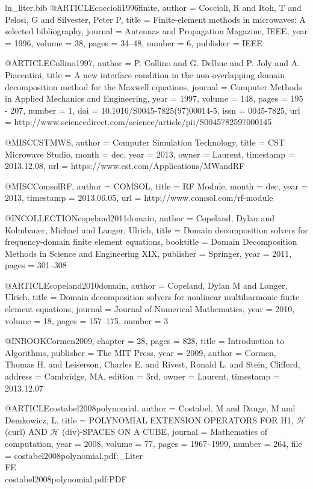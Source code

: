 \begin{filecontents*}{ln_liter.bib}
@ARTICLE{coccioli1996finite,
  author = {Coccioli, R and Itoh, T and Pelosi, G and Silvester, Peter P},
  title = {Finite-element methods in microwaves: A selected bibliography},
  journal = {Antennas and Propagation Magazine, IEEE},
  year = {1996},
  volume = {38},
  pages = {34--48},
  number = {6},
  publisher = {IEEE}
}

@ARTICLE{Collino1997,
  author = {P. Collino and G. Delbue and P. Joly and A. Piacentini},
  title = {A new interface condition in the non-overlapping domain decomposition
	method for the {M}axwell equations},
  journal = {Computer Methods in Applied Mechanics and Engineering},
  year = {1997},
  volume = {148},
  pages = {195 - 207},
  number = {1},
  doi = {10.1016/S0045-7825(97)00014-5},
  issn = {0045-7825},
  url = {http://www.sciencedirect.com/science/article/pii/S0045782597000145}
}

@MISC{CSTMWS,
  author = {{Computer Simulation Technology}},
  title = {{CST Microwave Studio}},
  month = dec,
  year = {2013},
  owner = {Laurent},
  timestamp = {2013.12.08},
  url = {https://www.cst.com/Applications/MWandRF}
}

@MISC{ComsolRF,
  author = {COMSOL},
  title = {{RF Module}},
  month = dec,
  year = {2013},
  timestamp = {2013.06.05},
  url = {http://www.comsol.com/rf-module}
}

@INCOLLECTION{copeland2011domain,
  author = {Copeland, Dylan and Kolmbauer, Michael and Langer, Ulrich},
  title = {Domain decomposition solvers for frequency-domain finite element
	equations},
  booktitle = {Domain Decomposition Methods in Science and Engineering XIX},
  publisher = {Springer},
  year = {2011},
  pages = {301--308}
}

@ARTICLE{copeland2010domain,
  author = {Copeland, Dylan M and Langer, Ulrich},
  title = {Domain decomposition solvers for nonlinear multiharmonic finite element
	equations},
  journal = {Journal of Numerical Mathematics},
  year = {2010},
  volume = {18},
  pages = {157--175},
  number = {3}
}

@INBOOK{Cormen2009,
  chapter = {28},
  pages = {828},
  title = {Introduction to Algorithms},
  publisher = {The MIT Press},
  year = {2009},
  author = {Cormen, Thomas H. and Leiserson, Charles E. and Rivest, Ronald L.
	and Stein, Clifford},
  address = {Cambridge, MA},
  edition = {3rd},
  owner = {Laurent},
  timestamp = {2013.12.07}
}

@ARTICLE{costabel2008polynomial,
  author = {Costabel, M and Dauge, M and Demkowicz, L},
  title = {POLYNOMIAL EXTENSION OPERATORS FOR H1, $\mathcal{H}$ (curl) AND $\mathcal{H}$
	(div)-SPACES ON A CUBE},
  journal = {Mathematics of computation},
  year = {2008},
  volume = {77},
  pages = {1967--1999},
  number = {264},
  file = {costabel2008polynomial.pdf:_Liter\\FE\\costabel2008polynomial.pdf:PDF}
}


\end{filecontents*}
